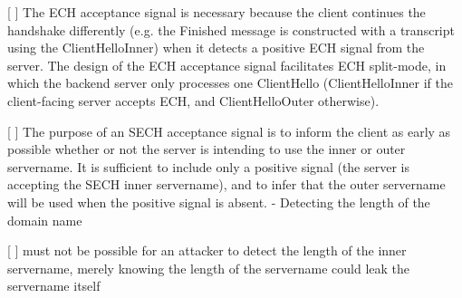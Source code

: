 [ ]  The ECH acceptance signal is necessary because the client continues the handshake differently (e.g. the Finished message is constructed with a transcript using the ClientHelloInner) when it detects a positive ECH  signal from the server. The design of the ECH acceptance signal facilitates ECH split-mode, in which the backend server only processes one ClientHello (ClientHelloInner if the client-facing server accepts ECH, and ClientHelloOuter otherwise).

[ ] The purpose of an SECH acceptance signal is to inform the client as early as possible whether or not the server is intending to use the inner or outer servername. It is sufficient to include only a positive signal (the server is accepting the SECH inner servername), and to infer that the outer servername will be used when the positive signal is absent.
    - Detecting the length of the domain name

[ ] must not be possible for an attacker to detect the length of the inner servername, merely knowing the length of the servername could leak the servername itself
